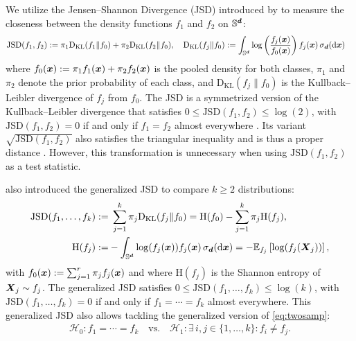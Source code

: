\documentclass[oneside,11pt]{article}
\begin{document}
We utilize the Jensen--Shannon Divergence (JSD) introduced by \cite{Lin1991} to measure the closeness between the density functions $f_1$ and $f_2$ on $\Sr$:
\begin{align*}
    \mathrm{JSD}(f_1,f_2)\defin&\;\pi_1\mathrm{D}_\mathrm{KL}(f_1\| f_0)+\pi_2\mathrm{D}_\mathrm{KL}(f_2\| f_0),\quad \mathrm{D}_\mathrm{KL}(f_j\| f_0)\defin\int_{\Sr}\log\left(\frac{f_j(\bx)}{f_0(\bx)}\right)f_j(\bx)\,\sigmar(\mathrm{d}\bx)
\end{align*}
where $f_0(\bx)\defin\pi_1 f_1(\bx)+\pi_2 f_2(\bx)$ is the pooled density for both classes, $\pi_1$ and $\pi_2$ denote the prior probability of each class, and $\mathrm{D}_\mathrm{KL}(f_j\| f_0)$ is the Kullback--Leibler divergence of $f_j$ from $f_0$. The JSD is a symmetrized version of the Kullback--Leibler divergence that satisfies $0\leq \mathrm{JSD}(f_1,f_2)\leq \log(2)$, with $\mathrm{JSD}(f_1,f_2)=0$ if and only if $f_1=f_2$ almost everywhere \citep{Lin1991}. Its variant $\sqrt{\mathrm{JSD}(f_1,f_2)}$ also satisfies the triangular inequality and is thus a proper distance \citep{Endres2003}. However, this transformation is unnecessary when using $\mathrm{JSD}(f_1,f_2)$ as a test statistic.

\cite{Lin1991} also introduced the generalized JSD to compare $k\geq2$ distributions:
\begin{align}
    \mathrm{JSD}(f_1,\ldots,f_k)\defin&\;\sum_{j=1}^k \pi_j\mathrm{D}_\mathrm{KL}(f_j\| f_0)=\mathrm{H}(f_0)-\sum_{j=1}^k \pi_j \mathrm{H}(f_j),\label{eq:jsd}\\
    \mathrm{H}(f_j)\defin& -\int_{\Sr} \log(f_j(\bx))f_j(\bx)\,\sigmar(\mathrm{d}\bx)=-\Es{\log(f_j(\bX_j))}{f_j},\nonumber
\end{align}
with $f_0(\bx)\defin\sum_{j=1}^r \pi_j f_j(\bx)$ and where $\mathrm{H}(f_j)$ is the Shannon entropy of $\bX_j\sim f_j$. The generalized JSD satisfies $0\leq \mathrm{JSD}(f_1,\ldots,f_k)\leq \log(k)$, with $\mathrm{JSD}(f_1,\ldots,f_k)=0$ if and only if $f_1=\cdots=f_k$ almost everywhere. This generalized JSD also allows tackling the generalized version of \eqref{eq:twosamp}:
\begin{align}
    \mathcal{H}_0:f_1=\cdots=f_k \quad\text{vs.} \quad \mathcal{H}_1: \exists\, i,j\in\{1,\ldots,k\}:f_i\neq f_j.\label{eq:ksamp}
\end{align}
\end{document}
